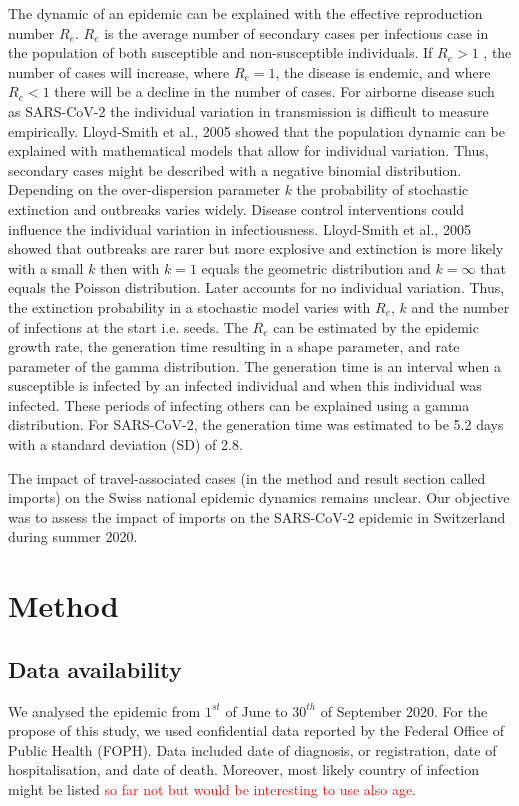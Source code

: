 \documentclass[10pt, a4paper, twoside]{article}
\begin{document}
\begin{multicols}{2}
The dynamic of an epidemic can be explained with the effective reproduction number $R_e$. $R_e$ is the average number of secondary cases per infectious case in the population of both susceptible and non-susceptible individuals. If $R_e > 1$ , the number of cases will increase, where $R_e = 1$, the disease is endemic, and where $R_e < 1$ there will be a decline in the number of cases. For airborne disease such as SARS-CoV-2 the individual variation in transmission is difficult to measure empirically. Lloyd-Smith et al., 2005 showed that the population dynamic can be explained with mathematical models that allow for individual variation.\cite{lloyd-smith_superspreading_2005}  Thus, secondary cases might be described with a negative binomial distribution. Depending on the over-dispersion parameter $k$ the probability of stochastic extinction and outbreaks varies widely. Disease control interventions could influence the individual variation in infectiousness.\cite{lloyd-smith_superspreading_2005} Lloyd-Smith et al., 2005 showed that outbreaks are rarer but more explosive and extinction is more likely with a small $k$ then with $k = 1$ equals the geometric distribution and $k = \infty$ that equals the Poisson distribution.\cite{lloyd-smith_superspreading_2005} Later accounts for no individual variation. Thus, the extinction probability in a stochastic model varies with $R_e$, $k$ and the number of infections at the start i.e. seeds. The $R_e$ can be estimated by the epidemic growth rate, the generation time resulting in a shape parameter, and rate parameter of the gamma distribution. The generation time is an interval when a susceptible is infected by an infected individual and when this individual was infected. These periods of infecting others can be explained using a gamma distribution. For SARS-CoV-2, the generation time was estimated to be 5.2 days with a standard deviation (SD) of 2.8.\cite{ganyani_estimating_2020}

The impact of travel-associated cases (in the method and result section called imports) on the Swiss national epidemic dynamics remains unclear. Our objective was to assess the impact of imports on the SARS-CoV-2 epidemic in Switzerland during summer 2020.

\section{Method}

\subsection{Data availability}
We analysed the epidemic from $1^{st}$ of June to $30^{th}$ of September 2020. For the propose of this study, we used confidential data reported by the Federal Office of Public Health (FOPH). Data included date of diagnosis, or registration, date of hospitalisation, and date of death. Moreover, most likely country of infection might be listed \textcolor{red}{so far not but would be interesting to use also age}.


\end{multicols}
\end{document}
